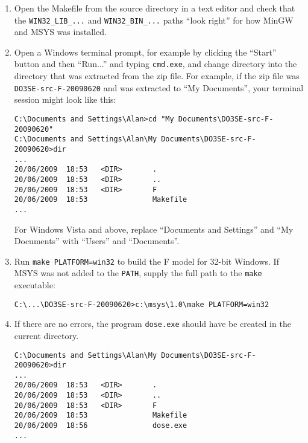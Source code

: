 \begin{enumerate}

\item Open the Makefile from the source directory in a text editor and check that the 
\verb|WIN32_LIB_...| and \verb|WIN32_BIN_...| paths ``look right'' for how MinGW and MSYS was 
installed.

\item Open a Windows terminal prompt, for example by clicking the ``Start'' button and then 
``Run...'' and typing \verb|cmd.exe|, and change directory into the directory that was extracted 
from the zip file.  For example, if the zip file was \verb|DO3SE-src-F-20090620| and was extracted 
to ``My Documents'', your terminal session might look like this:
\begin{lstlisting}
C:\Documents and Settings\Alan>cd "My Documents\DO3SE-src-F-20090620"
C:\Documents and Settings\Alan\My Documents\DO3SE-src-F-20090620>dir
...
20/06/2009  18:53   <DIR>       .
20/06/2009  18:53   <DIR>       ..
20/06/2009  18:53   <DIR>       F
20/06/2009  18:53               Makefile
...
\end{lstlisting}
For Windows Vista and above, replace ``Documents and Settings'' and ``My Documents'' with ``Users'' 
and ``Documents''.

\item Run \verb|make PLATFORM=win32| to build the F model for 32-bit Windows.  If MSYS was not added 
to the \verb|PATH|, supply the full path to the \verb|make| executable:
\begin{lstlisting}
C:\...\DO3SE-src-F-20090620>c:\msys\1.0\make PLATFORM=win32
\end{lstlisting}

\item If there are no errors, the program \verb|dose.exe| should have be created in the current 
directory.
\begin{lstlisting}
C:\Documents and Settings\Alan\My Documents\DO3SE-src-F-20090620>dir
...
20/06/2009  18:53   <DIR>       .
20/06/2009  18:53   <DIR>       ..
20/06/2009  18:53   <DIR>       F
20/06/2009  18:53               Makefile
20/06/2009  18:56               dose.exe
...
\end{lstlisting}

\end{enumerate}





